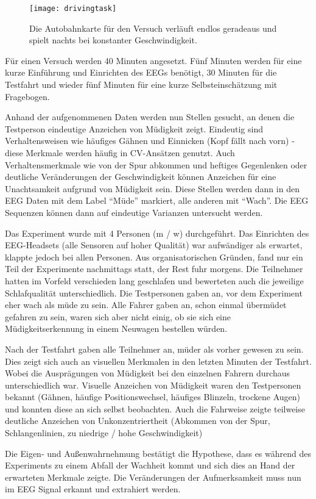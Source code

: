 \begin{figure}[h] 
  \begin{center}
    \texttt{[image: drivingtask]}
    \caption[Driving Task Screenshot]{Die Autobahnkarte für den Versuch verläuft endlos geradeaus und spielt nachts bei konstanter Geschwindigkeit. \label{fig:drivingtask}}
  \end{center}
\end{figure}

Für einen Versuch werden 40 Minuten angesetzt. Fünf Minuten werden für eine kurze Einführung und Einrichten des EEGs benötigt, 30 Minuten für die Testfahrt und wieder fünf Minuten für eine kurze Selbsteinschätzung mit Fragebogen.

Anhand der aufgenommenen Daten werden nun Stellen gesucht, an denen die Testperson eindeutige Anzeichen von Müdigkeit zeigt. Eindeutig sind Verhaltensweisen wie häufiges Gähnen und Einnicken (Kopf fällt nach vorn) - diese Merkmale werden häufig in CV-Ansätzen genutzt. 
Auch Verhaltensmerkmale wie von der Spur abkommen und heftiges Gegenlenken oder deutliche Veränderungen der Geschwindigkeit können Anzeichen für eine Unachtsamkeit aufgrund von Müdigkeit sein. Diese Stellen werden dann in den EEG Daten mit dem Label "`Müde"' markiert, alle anderen mit "`Wach"'. Die EEG Sequenzen können dann auf eindeutige Varianzen untersucht werden. 

Das Experiment wurde mit 4 Personen (m / w) durchgeführt. Das Einrichten des EEG-Headsets (alle Sensoren auf hoher Qualität) war aufwändiger als erwartet, klappte jedoch bei allen Personen. Aus organisatorischen Gründen, fand nur ein Teil der Experimente nachmittags statt, der Rest fuhr morgens. Die Teilnehmer hatten im Vorfeld verschieden lang geschlafen und bewerteten auch die jeweilige Schlafqualität unterschiedlich. Die Testpersonen gaben an, vor dem Experiment eher wach als müde zu sein. Alle Fahrer gaben an, schon einmal übermüdet gefahren zu sein, waren sich aber nicht einig, ob sie sich eine Müdigkeitserkennung in einem Neuwagen bestellen würden.

Nach der Testfahrt gaben alle Teilnehmer an, müder als vorher gewesen zu sein. Dies zeigt sich auch an visuellen Merkmalen in den letzten Minuten der Testfahrt. Wobei die Ausprägungen von Müdigkeit bei den einzelnen Fahrern durchaus unterschiedlich war. Visuelle Anzeichen von Müdigkeit waren den Testpersonen bekannt (Gähnen, häufige Positionswechsel, häufiges Blinzeln, trockene Augen) und konnten diese an sich selbst beobachten. Auch die Fahrweise zeigte teilweise deutliche Anzeichen von Unkonzentriertheit (Abkommen von der Spur, Schlangenlinien, zu niedrige / hohe Geschwindigkeit)\drivingTask

Die Eigen- und Außenwahrnehmung bestätigt die Hypothese, dass es während des Experiments zu einem Abfall der Wachheit kommt und sich dies an Hand der erwarteten Merkmale zeigte. Die Veränderungen der Aufmerksamkeit muss  nun im EEG Signal erkannt und extrahiert werden.